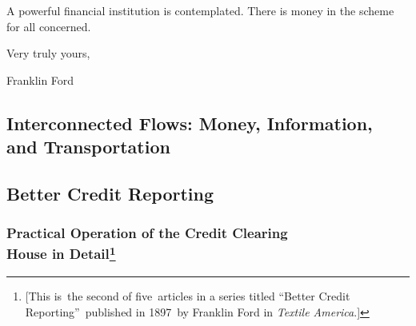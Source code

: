 \documentclass[twoside,symmetric,nobib,justified]{tufte-book}
\let\oldchapter\chapter
\def\chapter{%
  \setcounter{footnote}{0}%
  \oldchapter
}
\begin{document}
A powerful financial institution is contemplated. There is money in the
scheme for all concerned.~
\vspace{0.2in}
\begin{center}
    

Very truly yours,~
\end{center}

\vspace{0.1in}

\hspace{2in}Franklin Ford~~
\begin{fullwidth}


\part{Interconnected Flows: Money, Information, and Transportation}

\end{fullwidth}

\chapter[Better Credit Reporting]{Better Credit Reporting}
\label{ch:Better Credit Reporting}

\vspace{.2in}

\begin{LARGE}


\end{LARGE}

\vspace{0.5in}


\hypertarget{practical-operation-of-the-credit-clearing-house-in-detail}{%
\section[Practical Operation of the Credit Clearing House in
Detail]{\texorpdfstring{Practical Operation of the Credit Clearing\\\noindent House
in
Detail\footnote{{[}This is~the second of five~articles in a series
  titled ``Better Credit Reporting''~published in 1897~by Franklin Ford
  in \emph{Textile America}.{]}}}{Practical Operation of the Credit Clearing House in Detail}}\label{practical-operation-of-the-credit-clearing-house-in-detail}}
\end{document}
